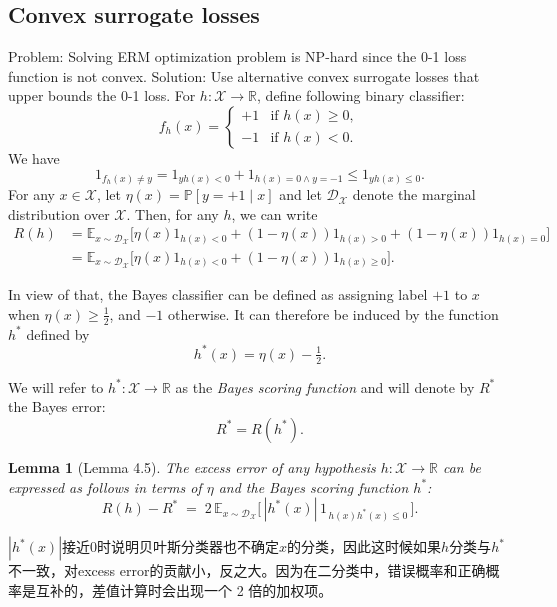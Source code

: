 \documentclass[12pt]{article}
\theoremstyle{definition} %
\theoremstyle{plain} %
\newtheorem{lemma}[definition]{Lemma}
\theoremstyle{remark} %
\newcommand{\R}{\mathbb{R}}
\begin{document}
\begin{CJK}{UTF8}{gbsn}
\subsection{Convex surrogate losses}
Problem: Solving ERM optimization problem is NP-hard since the 0-1 loss function is not convex.
Solution: Use alternative convex surrogate losses that upper bounds the 0-1 loss. 
For $h:\mathcal{X} \to \R$, define following binary classifier:
\[
f_h(x) = 
\begin{cases}
+1 & \text{if } h(x) \geq 0, \\
-1 & \text{if } h(x) < 0.
\end{cases}
\]
We have
\[
1_{f_h(x)\neq y} = 1_{y h(x)<0} + 1_{h(x)=0 \wedge y=-1} \leq 1_{y h(x)\leq 0}.
\]
For any \( x \in \mathcal{X} \), let 
\(\eta(x) = \mathbb{P}[y=+1 \mid x]\) 
and let \(\mathcal{D}_\mathcal{X}\) denote the marginal distribution over \(\mathcal{X}\). 
Then, for any \( h \), we can write
\[
\begin{aligned}
R(h) 
&= \mathbb{E}_{x \sim \mathcal{D}_\mathcal{X}} 
   \big[ \eta(x) 1_{h(x)<0} + (1-\eta(x)) 1_{h(x)>0} + (1-\eta(x))1_{h(x)=0} \big] \\
&= \mathbb{E}_{x \sim \mathcal{D}_\mathcal{X}} 
   \big[ \eta(x) 1_{h(x)<0} + (1-\eta(x)) 1_{h(x)\geq 0} \big].
\end{aligned}
\]

In view of that, the Bayes classifier can be defined as assigning label \(+1\) to \(x\) 
when \(\eta(x) \geq \tfrac{1}{2}\), and \(-1\) otherwise. 
It can therefore be induced by the function \( h^* \) defined by
\[
h^*(x) = \eta(x) - \tfrac{1}{2}. \tag{4.9}
\]

We will refer to \( h^* : \mathcal{X} \to \mathbb{R} \) as the 
\textit{Bayes scoring function} and will denote by \( R^* \) the Bayes error: 
\[
R^* = R(h^*).
\]

\begin{lemma}[Lemma 4.5]
The excess error of any hypothesis $h : \mathcal{X} \to \mathbb{R}$ 
can be expressed as follows in terms of $\eta$ and the Bayes scoring function $h^*$:
\[
R(h) - R^* \;=\; 2 \, \mathbb{E}_{x \sim \mathcal{D}_{\mathcal{X}}} 
\Big[\, |h^*(x)| \, 1_{\,h(x) h^*(x) \leq 0} \,\Big].
\]
\end{lemma}
$|h^*(x)|$接近0时说明贝叶斯分类器也不确定$x$的分类，因此这时候如果$h$分类与$h^*$不一致，对excess error的贡献小，反之大。因为在二分类中，错误概率和正确概率是互补的，差值计算时会出现一个 2 倍的加权项。

\end{CJK}
\end{document}
